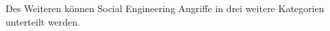 Des Weiteren können Social Engineering Angriffe in drei weitere Kategorien unterteilt werden.
%
%
%
%
%
%
%
%
%
%
%
